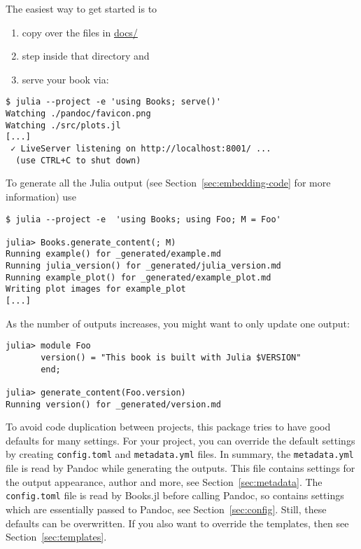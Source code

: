 \documentclass[
  14pt
  american,
  paper=a4,
  ,captions=tableheading
]{scrreprt}
\newcommand{\passthrough}[1]{#1}
\providecommand{\tightlist}{%
  \setlength{\itemsep}{0pt}\setlength{\parskip}{0pt}}
\begin{document}
The easiest way to get started is to

\begin{enumerate}
\def\labelenumi{\arabic{enumi}.}
\tightlist
\item
  copy over the files in
  \href{https://github.com/rikhuijzer/Books.jl/tree/main/docs}{docs/}
\item
  step inside that directory and
\item
  serve your book via:
\end{enumerate}

\begin{lstlisting}
$ julia --project -e 'using Books; serve()'
Watching ./pandoc/favicon.png
Watching ./src/plots.jl
[...]
 ✓ LiveServer listening on http://localhost:8001/ ...
  (use CTRL+C to shut down)
\end{lstlisting}

To generate all the Julia output (see Section~\ref{sec:embedding-code}
for more information) use

\begin{lstlisting}
$ julia --project -e  'using Books; using Foo; M = Foo'

julia> Books.generate_content(; M)
Running example() for _generated/example.md
Running julia_version() for _generated/julia_version.md
Running example_plot() for _generated/example_plot.md
Writing plot images for example_plot
[...]
\end{lstlisting}

As the number of outputs increases, you might want to only update one
output:

\begin{lstlisting}
julia> module Foo
       version() = "This book is built with Julia $VERSION"
       end;

julia> generate_content(Foo.version)
Running version() for _generated/version.md
\end{lstlisting}

To avoid code duplication between projects, this package tries to have
good defaults for many settings. For your project, you can override the
default settings by creating \passthrough{\lstinline!config.toml!} and
\passthrough{\lstinline!metadata.yml!} files. In summary, the
\passthrough{\lstinline!metadata.yml!} file is read by Pandoc while
generating the outputs. This file contains settings for the output
appearance, author and more, see Section~\ref{sec:metadata}. The
\passthrough{\lstinline!config.toml!} file is read by Books.jl before
calling Pandoc, so contains settings which are essentially passed to
Pandoc, see Section~\ref{sec:config}. Still, these defaults can be
overwritten. If you also want to override the templates, then see
Section~\ref{sec:templates}.
\end{document}
